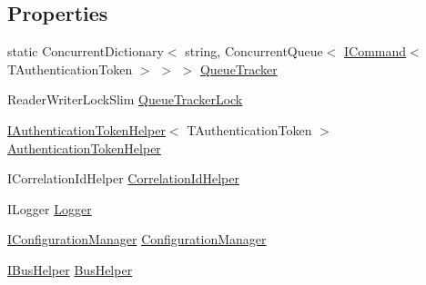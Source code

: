 \subsection*{Properties}
\begin{DoxyCompactItemize}
\item 
static Concurrent\+Dictionary$<$ string, Concurrent\+Queue$<$ \hyperlink{interfaceCqrs_1_1Commands_1_1ICommand}{I\+Command}$<$ T\+Authentication\+Token $>$ $>$ $>$ \hyperlink{classCqrs_1_1Bus_1_1QueuedCommandBusReceiver_a2fc62989429929acd8ea66808a8c4a78_a2fc62989429929acd8ea66808a8c4a78}{Queue\+Tracker}
\item 
Reader\+Writer\+Lock\+Slim \hyperlink{classCqrs_1_1Bus_1_1QueuedCommandBusReceiver_ac633e2d140fc90fab100acba4afa136b_ac633e2d140fc90fab100acba4afa136b}{Queue\+Tracker\+Lock}
\item 
\hyperlink{interfaceCqrs_1_1Authentication_1_1IAuthenticationTokenHelper}{I\+Authentication\+Token\+Helper}$<$ T\+Authentication\+Token $>$ \hyperlink{classCqrs_1_1Bus_1_1QueuedCommandBusReceiver_a809cb92ece6c52bbbe3abc347be0470d_a809cb92ece6c52bbbe3abc347be0470d}{Authentication\+Token\+Helper}
\item 
I\+Correlation\+Id\+Helper \hyperlink{classCqrs_1_1Bus_1_1QueuedCommandBusReceiver_a4cf8781cab9cb844892eb032cfca773f_a4cf8781cab9cb844892eb032cfca773f}{Correlation\+Id\+Helper}
\item 
I\+Logger \hyperlink{classCqrs_1_1Bus_1_1QueuedCommandBusReceiver_a0d0174c10f6cde11cd5a9d76092f3058_a0d0174c10f6cde11cd5a9d76092f3058}{Logger}
\item 
\hyperlink{interfaceCqrs_1_1Configuration_1_1IConfigurationManager}{I\+Configuration\+Manager} \hyperlink{classCqrs_1_1Bus_1_1QueuedCommandBusReceiver_acd7c3367d16742abd5e650f6bacf4df9_acd7c3367d16742abd5e650f6bacf4df9}{Configuration\+Manager}
\item 
\hyperlink{interfaceCqrs_1_1Bus_1_1IBusHelper}{I\+Bus\+Helper} \hyperlink{classCqrs_1_1Bus_1_1QueuedCommandBusReceiver_acc1fa8c5074a43382bcf21805b4ee709_acc1fa8c5074a43382bcf21805b4ee709}{Bus\+Helper}

\end{DoxyCompactItemize}

